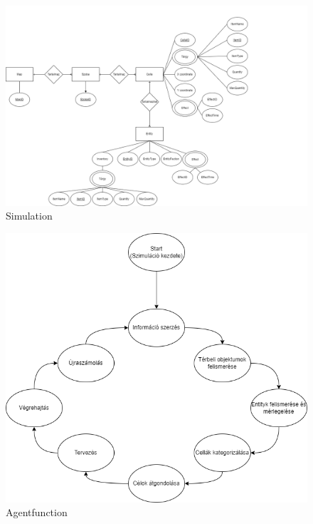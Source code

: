\begin{figure}[!ht]
	\centering
	\includegraphics[scale=0.3]{images/simulationER3.png}
	\caption{Simulation}
	\label{fig:simulation}
\end{figure}

\begin{figure}[!ht]
	\centering
	\includegraphics[scale=0.6]{images/agentfunction.png}
	\caption{Agentfunction}
	\label{fig:agentfunction}
\end{figure}


